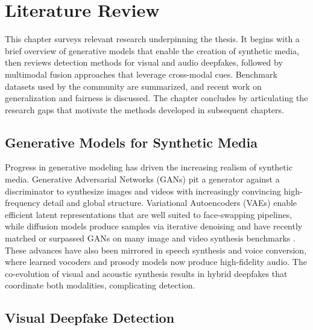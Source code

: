 \chapter{Literature Review}

This chapter surveys relevant research underpinning the thesis. It begins with a brief overview of generative models that enable the creation of synthetic media, then reviews detection methods for visual and audio deepfakes, followed by multimodal fusion approaches that leverage cross-modal cues. Benchmark datasets used by the community are summarized, and recent work on generalization and fairness is discussed. The chapter concludes by articulating the research gaps that motivate the methods developed in subsequent chapters.

\section{Generative Models for Synthetic Media}
Progress in generative modeling has driven the increasing realism of synthetic media. Generative Adversarial Networks (GANs) pit a generator against a discriminator to synthesize images and videos with increasingly convincing high-frequency detail and global structure. Variational Autoencoders (VAEs) enable efficient latent representations that are well suited to face-swapping pipelines, while diffusion models produce samples via iterative denoising and have recently matched or surpassed GANs on many image and video synthesis benchmarks \cite{kaur2024deepfake}. These advances have also been mirrored in speech synthesis and voice conversion, where learned vocoders and prosody models now produce high-fidelity audio. The co-evolution of visual and acoustic synthesis results in hybrid deepfakes that coordinate both modalities, complicating detection.

\section{Visual Deepfake Detection}
